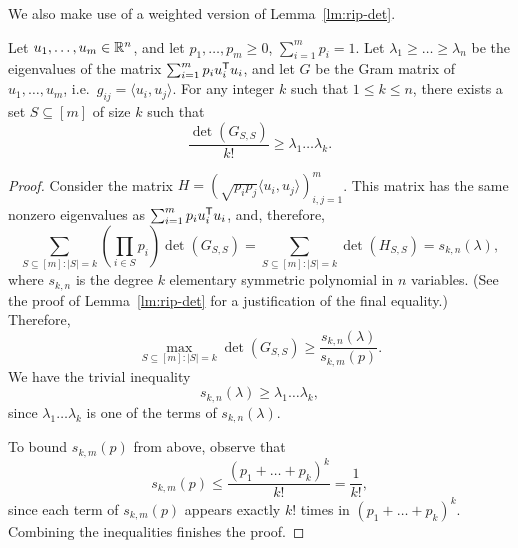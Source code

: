 We also make use of a weighted version of Lemma~\ref{lm:rip-det}.
\begin{lemma}\label{lm:rip-det-weighted}
  Let $u_1, \ldots, u_m \in {\mathbb{R}}^n$, and let $p_1, \ldots, p_m \ge 0$,
  $\sum_{i = 1}^mp_i = 1$. Let $\lambda_1 \ge \ldots \ge \lambda_n$ be
  the eigenvalues of the matrix $\sum_{i=1}^m{p_i u_i^\mathsf T u_i}$, and
  let $G$ be the Gram matrix of $u_1, \ldots, u_m$, i.e.~$g_{ij} =
  \langle u_i, u_j\rangle$. For any integer $k$ such that $1 \le k \le
  n$, there exists a set $S \subseteq [m]$ of size $k$ such that
  \[
  \frac{\det(G_{S,S})}{k!} \ge\lambda_1 \ldots \lambda_k. 
  \]
\end{lemma}
\begin{proof}
  Consider the matrix $H = (\sqrt{p_ip_j}\langle u_i, u_j
  \rangle)_{i,j = 1}^m$. This matrix has the same nonzero eigenvalues as
  $\sum_{i=1}^m{p_i u_i^\mathsf T u_i}$, and, therefore,
  \[
  \sum_{S \subseteq [m]: |S| = k}{\left(\prod_{i \in S}{p_i}\right)\det(G_{S,S})}
  = \sum_{S \subseteq [m]: |S| = k}\det(H_{S,S}) = s_{k,n}(\lambda),
  \]
  where $s_{k,n}$ is the degree $k$ elementary symmetric polynomial in $n$
  variables. (See the proof of Lemma~\ref{lm:rip-det} for a
  justification of the final equality.) Therefore, 
  \[
  \max_{S \subseteq [m]: |S| = k}\det(G_{S,S}) 
  \ge \frac{s_{k,n}(\lambda)}{s_{k,m}(p)}. 
  \]
  We have the trivial inequality
  \[
  s_{k,n}(\lambda) \ge \lambda_1 \ldots \lambda_k,
  \]
  since $\lambda_1 \ldots \lambda_k$ is one of the terms of
  $s_{k,n}(\lambda)$. 
  
  To bound $s_{k,m}(p)$ from above, observe that
  \[
  s_{k,m}(p) \le \frac{(p_1 + \ldots + p_k)^k}{k!} = \frac{1}{k!},
  \]
  since each term of $s_{k,m}(p)$ appears exactly $k!$ times in 
  $(p_1 + \ldots + p_k)^k$.  Combining the inequalities finishes the proof. 
\end{proof}

